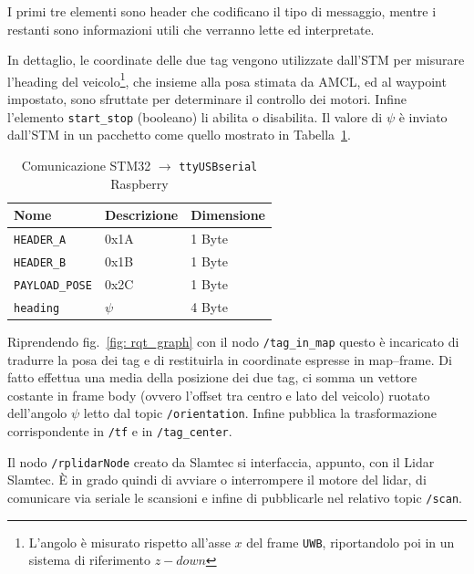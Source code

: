 I primi tre elementi sono header che codificano il tipo di messaggio, mentre i restanti sono informazioni utili che verranno lette ed interpretate. 

In dettaglio, le coordinate delle due tag vengono utilizzate dall'STM per misurare l'heading del veicolo\footnote{L'angolo è misurato rispetto all'asse $x$ del frame \texttt{UWB}, riportandolo poi in un sistema di riferimento $z-down$}, che insieme alla posa stimata da AMCL, ed al waypoint impostato, sono sfruttate per determinare il controllo dei motori. Infine l'elemento \verb!start_stop! (booleano) li abilita o disabilita.
Il valore di $\psi$ è inviato dall'STM in un pacchetto come quello mostrato in Tabella~\ref{tab: comunicazione_stm2seriale}.

\begin{table}[h]
	\centering

	\begin{tabular}{lll}
		\hline
		Nome                     & Descrizione   & Dimensione\\
		\hline
		\verb!HEADER_A!          & 0x1A          & 1 Byte\\
		\verb!HEADER_B!          & 0x1B          & 1 Byte\\
		\verb!PAYLOAD_POSE!      & 0x2C          & 1 Byte\\
		\hline
		\verb!heading!           & $\psi$         & 4 Byte\\
		\hline
	\end{tabular}
	\caption{Comunicazione STM32 $\rightarrow$ \texttt{ttyUSBserial} Raspberry}
	\label{tab: comunicazione_stm2seriale}
\end{table}

\vspace{0.5mm}
Riprendendo fig.~\ref{fig: rqt_graph} con il nodo \verb|/tag_in_map| questo \`e incaricato di tradurre la posa dei tag e di restituirla in coordinate espresse in map--frame. 
Di fatto effettua una media della posizione dei due tag, ci somma un vettore costante in frame body (ovvero l'offset tra centro e lato del veicolo) ruotato dell'angolo $\psi$ letto dal topic \verb|/orientation|.
Infine pubblica la trasformazione corrispondente in \verb|/tf| e in \verb|/tag_center|.

\vspace{0.5mm}
Il nodo \verb|/rplidarNode| creato da Slamtec si interfaccia, appunto, con il Lidar Slamtec. 
\`E in grado quindi di avviare o interrompere il motore del lidar, di comunicare via seriale le scansioni e infine di pubblicarle nel relativo topic \verb|/scan|.

